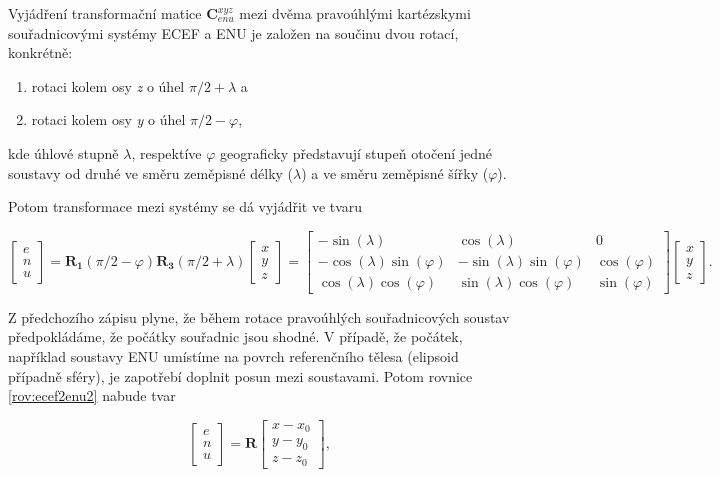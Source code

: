 \documentclass[11pt,a4paper]{article}
\begin{document}
Vyjádření transformační matice $\mathbf {C}_{enu}^{xyz} $ mezi dvěma pravoúhlými kartézskymi souřadnicovými systémy ECEF a ENU je založen na součinu dvou rotací, konkrétně:
\begin{enumerate}
\item rotaci kolem osy \textit{z} o úhel $\pi/2 + \lambda $ a
\item rotaci kolem osy \textit{y} o úhel $\pi/2 - \varphi $,
\end{enumerate}
kde úhlové stupně $\lambda$, respektíve $\varphi$ geograficky představují stupeň otočení jedné soustavy od druhé ve směru zeměpisné délky ($\lambda$) a ve směru zeměpisné šířky ($\varphi$).

Potom transformace mezi systémy se dá vyjádřit ve tvaru

\begin{equation}
\begin{bmatrix}
e \\
n \\
u
\end{bmatrix} =
\mathbf{R_{1}}\left(\pi/2-\varphi\right)\mathbf{R_{3}}\left(\pi/2+\lambda\right)
\begin{bmatrix}
x \\
y \\
z
\end{bmatrix} =
\begin{bmatrix}
-\sin{\left(\lambda\right)} & \cos{\left(\lambda\right)} & 0 \\
-\cos{\left(\lambda\right)}\sin{\left(\varphi\right)} & -\sin{\left(\lambda\right)}\sin{\left(\varphi\right)} & \cos{\left(\varphi\right)} \\
\cos{\left(\lambda\right)}\cos{\left(\varphi\right)} & \sin{\left(\lambda\right)}\cos{\left(\varphi\right)} & \sin{\left(\varphi\right)}
\end{bmatrix}
\begin{bmatrix}
x \\
y \\
z
\end{bmatrix}.
\label{rov:ecef2enu2}
\end{equation}

Z předchozího zápisu plyne, že během rotace pravoúhlých souřadnicových soustav předpokládáme, že počátky souřadnic jsou shodné. V případě, že počátek, například soustavy ENU umístíme na povrch referenčního tělesa (elipsoid případně sféry), je zapotřebí doplnit posun mezi soustavami. Potom rovnice \ref{rov:ecef2enu2} nabude tvar

\begin{equation}
\begin{bmatrix}
e \\
n \\
u
\end{bmatrix} =
\mathbf{R}
\begin{bmatrix}
x - x_{0} \\
y - y_{0} \\
z - z_{0}
\end{bmatrix},
\label{rov:ecef2enu22}
\end{equation}
\end{document}
